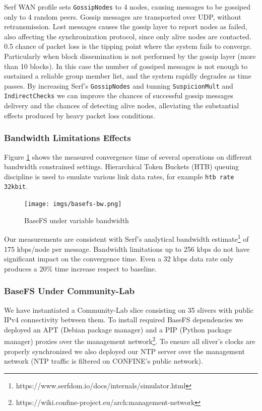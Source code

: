 \documentclass{sig-alternate}
\begin{document}
Serf WAN profile sets \texttt{GossipNodes} to 4 nodes, causing messages to be gossiped only to 4 random peers. Gossip messages are transported over UDP, without retransmission. Lost messages causes the gossip layer to report nodes as failed, also affecting the synchronization protocol, since only alive nodes are contacted. 0.5 chance of packet loss is the tipping point where the system fails to converge. Particularly when block dissemination is not performed by the gossip layer (more than 10 blocks). In this case the number of gossiped messages is not enough to sustained a reliable group member list, and the system rapidly degrades as time passes. By increasing Serf's \texttt{GossipNodes} and tunning \texttt{SuspicionMult} and \texttt{IndirectChecks} we can improve the chances of successful gossip messages delivery and the chances of detecting alive nodes, alleviating the substantial effects produced by heavy packet loss conditions.


\subsubsection{Bandwidth Limitations Effects}

Figure \ref{fig:basefs-bw} shows the measured convergence time of several operations on different bandwidth constrained settings. Hierarchical Token Buckets (HTB) queuing discipline is used to emulate various link data rates, for example \texttt{htb rate 32kbit}.

\begin{figure}
\centering
\texttt{[image: imgs/basefs-bw.png]}
\caption{BaseFS under variable bandwidth}
\label{fig:basefs-bw}
\end{figure}

Our measurements are consistent with Serf's analytical bandwidth estimate\footnote{https://www.serfdom.io/docs/internals/simulator.html} of 175 kbps/node per message. Bandwidth limitations up to 256 kbps do not have significant impact on the convergence time. Even a 32 kbps data rate only produces a 20\% time increase respect to baseline.

\subsubsection{BaseFS Under Community-Lab}

We have instantiated a Community-Lab slice consisting on 35 slivers with public IPv4 connectivity between them. To install required BaseFS dependencies we deployed an APT (Debian package manager) and a PIP (Python package manager) proxies over the management network\footnote{https://wiki.confine-project.eu/arch:management-network}. To ensure all sliver's clocks are properly synchronized we also deployed our NTP server over the management network (NTP traffic is filtered on CONFINE's public network).
\end{document}
